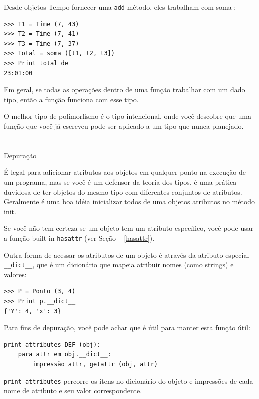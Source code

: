 \documentclass[10pt]{book}
\begin{document}
\begin{exercise}
\begin{v erbatim}
Desde objetos Tempo fornecer uma {\tt add} método, eles trabalham
com {soma \tt}:

\begin{verbatim}
>>> T1 = Time (7, 43)
>>> T2 = Time (7, 41)
>>> T3 = Time (7, 37)
>>> Total = soma ([t1, t2, t3])
>>> Print total de
23:01:00
\end{verbatim}
%
Em geral, se todas as operações dentro de uma função 
trabalhar com um dado tipo, então a função funciona com esse tipo.

O melhor tipo de polimorfismo é o tipo intencional, onde
você descobre que uma função que você já escreveu pode ser
aplicado a um tipo que nunca planejado.


\section{} Depuração

É legal para adicionar atributos aos objetos em qualquer ponto na execução
de um programa, mas se você é um defensor da teoria dos tipos, é uma
prática duvidosa de ter objetos do mesmo tipo com diferentes
conjuntos de atributos. Geralmente é uma boa idéia
inicializar todos de uma objetos atributos no método init.

Se você não tem certeza se um objeto tem um atributo específico, você
pode usar a função built-in {\tt hasattr} (ver Seção ~ \ref {hasattr}).

Outra forma de acessar os atributos de um objeto é através da
atributo especial \verb "__dict__", que é um dicionário que mapeia
atribuir nomes (como strings) e valores:

\begin{verbatim}
>>> P = Ponto (3, 4)
>>> Print p.__dict__
{'Y': 4, 'x': 3}
\end{verbatim}
%
Para fins de depuração, você pode achar que é útil para manter esta
função útil:

\begin{verbatim}
print_attributes DEF (obj):
    para attr em obj.__dict__:
        impressão attr, getattr (obj, attr)
\end{verbatim}
%
\verb "print_attributes" percorre os itens no dicionário do objeto
e impressões de cada nome de atributo e seu valor correspondente.


\end{v erbatim}
\end{exercise}
\end{document}
